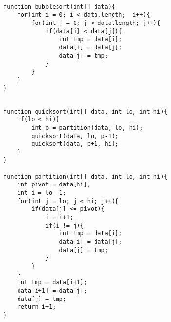 \begin{minipage}[t]{0.45\linewidth}
\begin{lstlisting}[label={8_bubblesort},caption={Bubblesort}]

function bubblesort(int[] data){
	for(int i = 0; i < data.length;  i++){
		for(int j = 0; j < data.length; j++){
			if(data[i] < data[j]){
				int tmp = data[i];
				data[i] = data[j];
				data[j] = tmp;
			}
		}
	}
}

\end{lstlisting}
\end{minipage}
%
\begin{minipage}[t]{0.45\linewidth}
\begin{lstlisting}[label={8_quicksort}, caption={Quicksort}]

function quicksort(int[] data, int lo, int hi){
	if(lo < hi){
		int p = partition(data, lo, hi);
		quicksort(data, lo, p-1);
		quicksort(data, p+1, hi);
	}
}

function partition(int[] data, int lo, int hi){
	int pivot = data[hi];
	int i = lo -1;
	for(int j = lo; j < hi; j++){
		if(data[j] <= pivot){
			i = i+1;
			if(i != j){
				int tmp = data[i];
				data[i] = data[j];
				data[j] = tmp;
			}
		}
	}
	int tmp = data[i+1];
	data[i+1] = data[j];
	data[j] = tmp;
	return i+1;
}

\end{lstlisting}
\end{minipage}



